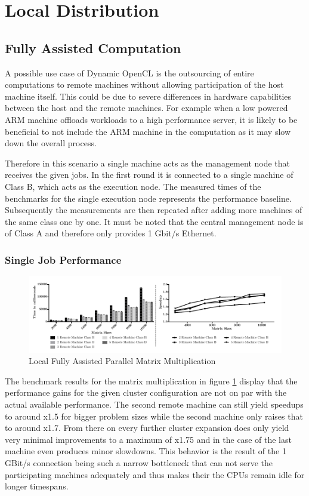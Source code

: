 \section{Local Distribution}
\label{local_distribution}

\subsection{Fully Assisted Computation}
A possible use case of Dynamic OpenCL is the outsourcing of entire computations to remote machines without allowing participation of the host machine itself. This could be due to severe differences in hardware capabilities between the host and the remote machines. For example when a low powered ARM machine offloads workloads to a high performance server, it is likely to be beneficial to not include the ARM machine in the computation as it may slow down the overall process.

Therefore in this scenario a single machine acts as the management node that receives the given jobs. In the first round it is connected to a single machine of Class B, which acts as the execution node. The measured times of the benchmarks for the single execution node represents the performance baseline. Subsequently the measurements are then repeated after adding more machines of the same class one by one. It must be noted that the central management node is of Class A and therefore only provides 1 Gbit/s Ethernet.

\subsubsection*{Single Job Performance}

\begin{figure}[H]
	
	\includegraphics[width=1.0\textwidth]{images/local_fully_assisted_matrix.pdf}
	\centering
	\caption{Local Fully Assisted Parallel Matrix Multiplication}
	\label{img:fully_assisted_parallel_matrix}
\end{figure}

The benchmark results for the matrix multiplication in figure \ref{img:fully_assisted_parallel_matrix} display that the performance gains for the given cluster configuration are not on par with the actual available performance. The second remote machine can still yield speedups to around x1.5 for bigger problem sizes while the second machine only raises that to around x1.7. From there on every further cluster expansion does only yield very minimal improvements to a maximum of x1.75 and in the case of the last machine even produces minor slowdowns. This behavior is the result of the 1 GBit/s connection being such a narrow bottleneck that can not serve the participating machines adequately and thus makes their the CPUs remain idle for longer timespans.  

